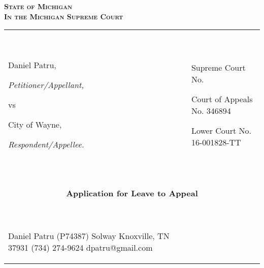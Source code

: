 \documentclass[12pt,\documentclassflag]{michiganCourtOfAppealsBrief}
\begin{document}
\begin{centering}
\bf\scshape State of Michigan\\In the Michigan Supreme Court

\rm 

\makeandtab
\setlength{\tabcolsep}{20pt}%
\begin{tabular}{p{} p{}}
  {~

  \raggedright Daniel Patru,\par
  \hfill\textit{Petitioner/Appellant,}
  \vspace{.5\baselineskip}\par
  vs\par
  \vspace{.5\baselineskip}
  \raggedright City of Wayne,\par
  \hfill\textit{Respondent/Appellee.}
  
  ~} &  {~
       \par\par
       Supreme Court No. \underline{\hspace{5em}}\par
       Court of Appeals No. 346894\par
       Lower Court No. 16-001828-TT\par\vspace{\baselineskip}

  ~}
  \\ \cline{1-2}\vspace{2mm}\\

  \vspace{3em}\\
  
  \multicolumn{2}{c}{\textbf{Application for Leave to Appeal}}\\
  {~ 
  \vspace{3em}
  
  Daniel Patru (P74387) \newline%
  3309 Solway\newline%
  Knoxville, TN 37931\newline%
  (734) 274-9624\newline%
  dpatru@gmail.com\newline\newline%
  ~} & {~ %
       \vspace{3em}
       
}
\end{tabular}
\end{centering}
\end{document}

